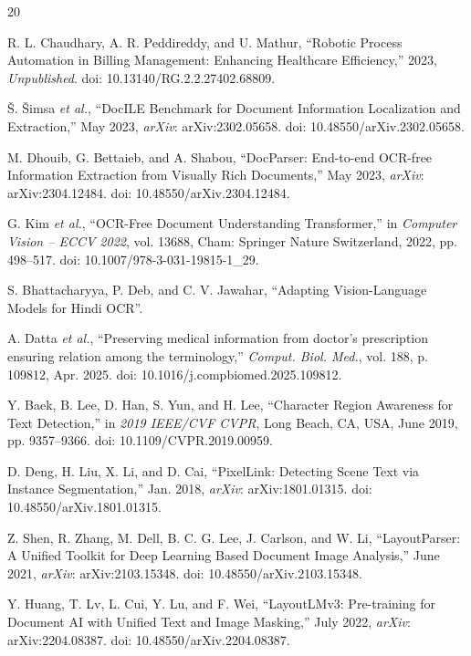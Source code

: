 \documentclass[conference,twocolumn]{IEEEtran}
\begin{document}
\balance
\begin{thebibliography}{20}

R. L. Chaudhary, A. R. Peddireddy, and U. Mathur, ``Robotic Process Automation in Billing Management: Enhancing Healthcare Efficiency,'' 2023, \textit{Unpublished}. doi: 10.13140/RG.2.2.27402.68809.

Š. Šimsa \textit{et al.}, ``DocILE Benchmark for Document Information Localization and Extraction,'' May 2023, \textit{arXiv}: arXiv:2302.05658. doi: 10.48550/arXiv.2302.05658.

M. Dhouib, G. Bettaieb, and A. Shabou, ``DocParser: End-to-end OCR-free Information Extraction from Visually Rich Documents,'' May 2023, \textit{arXiv}: arXiv:2304.12484. doi: 10.48550/arXiv.2304.12484.

G. Kim \textit{et al.}, ``OCR-Free Document Understanding Transformer,'' in \textit{Computer Vision -- ECCV 2022}, vol. 13688, Cham: Springer Nature Switzerland, 2022, pp. 498--517. doi: 10.1007/978-3-031-19815-1\_29.

S. Bhattacharyya, P. Deb, and C. V. Jawahar, ``Adapting Vision-Language Models for Hindi OCR''.

A. Datta \textit{et al.}, ``Preserving medical information from doctor's prescription ensuring relation among the terminology,'' \textit{Comput. Biol. Med.}, vol. 188, p. 109812, Apr. 2025. doi: 10.1016/j.compbiomed.2025.109812.

Y. Baek, B. Lee, D. Han, S. Yun, and H. Lee, ``Character Region Awareness for Text Detection,'' in \textit{2019 IEEE/CVF CVPR}, Long Beach, CA, USA, June 2019, pp. 9357--9366. doi: 10.1109/CVPR.2019.00959.

D. Deng, H. Liu, X. Li, and D. Cai, ``PixelLink: Detecting Scene Text via Instance Segmentation,'' Jan. 2018, \textit{arXiv}: arXiv:1801.01315. doi: 10.48550/arXiv.1801.01315.

Z. Shen, R. Zhang, M. Dell, B. C. G. Lee, J. Carlson, and W. Li, ``LayoutParser: A Unified Toolkit for Deep Learning Based Document Image Analysis,'' June 2021, \textit{arXiv}: arXiv:2103.15348. doi: 10.48550/arXiv.2103.15348.

Y. Huang, T. Lv, L. Cui, Y. Lu, and F. Wei, ``LayoutLMv3: Pre-training for Document AI with Unified Text and Image Masking,'' July 2022, \textit{arXiv}: arXiv:2204.08387. doi: 10.48550/arXiv.2204.08387.


\end{thebibliography}
\end{document}
